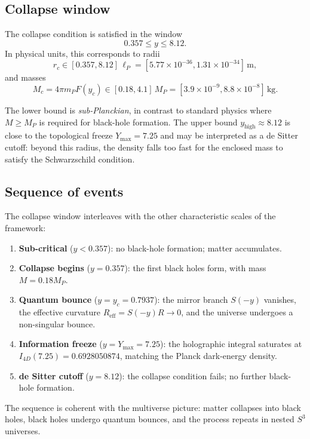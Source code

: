 \documentclass[12pt,oneside,openany]{book}
\begin{document}
\subsection{Collapse window}

The collapse condition is satisfied in the window
\begin{equation}
\boxed{\;0.357\le y\le 8.12.\;}
\label{eq:window}
\end{equation}
In physical units, this corresponds to radii
\begin{equation}
r_{c}\in[0.357,8.12]\,\ell_{P}
=
[5.77\times 10^{-36},1.31\times 10^{-34}]\,\text{m},
\label{eq:rc-window}
\end{equation}
and masses
\begin{equation}
M_{c}=4\pi m_{P}F(y_{c})
\in
[0.18,4.1]\,M_{P}
=
[3.9\times 10^{-9},8.8\times 10^{-8}]\,\text{kg}.
\label{eq:Mc-window}
\end{equation}

The lower bound is \emph{sub-Planckian}, in contrast to
standard physics where $M\ge M_{P}$ is required for black-hole
formation. The upper bound $y_{\text{high}}\approx 8.12$ is
close to the topological freeze $Y_{\max}=7.25$ and may be
interpreted as a de Sitter cutoff: beyond this radius, the
density falls too fast for the enclosed mass to satisfy the
Schwarzschild condition.

\subsection{Sequence of events}

The collapse window interleaves with the other characteristic
scales of the framework:
\begin{enumerate}
\item \textbf{Sub-critical} ($y<0.357$): no black-hole
formation; matter accumulates.
\item \textbf{Collapse begins} ($y=0.357$): the first black
holes form, with mass $M=0.18 M_{P}$.
\item \textbf{Quantum bounce} ($y=y_{c}=0.7937$): the mirror
branch $S(-y)$ vanishes, the effective curvature
$R_{\text{eff}}=S(-y)R\to 0$, and the universe undergoes a
non-singular bounce.
\item \textbf{Information freeze} ($y=Y_{\max}=7.25$): the
holographic integral saturates at
$I_{4D}(7.25)=0.6928050874$, matching the Planck dark-energy
density.
\item \textbf{de Sitter cutoff} ($y=8.12$): the collapse
condition fails; no further black-hole formation.
\end{enumerate}
The sequence is coherent with the multiverse picture: matter
collapses into black holes, black holes undergo quantum
bounces, and the process repeats in nested $S^{3}$ universes.
\end{document}

